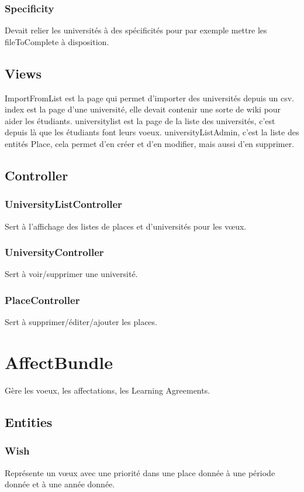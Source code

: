 \subsubsection{Specificity}
Devait relier les universités à des spécificités pour par exemple mettre les fileToComplete à disposition.

\subsection{Views}
ImportFromList est la page qui permet d'importer des universités depuis un csv.
index est la page d'une université, elle devait contenir une sorte de wiki pour aider les étudiants.
universitylist est la page de la liste des universités, c'est depuis là que les étudiants font leurs voeux.
universityListAdmin, c'est la liste des entités Place, cela permet d'en créer et d'en modifier, mais aussi d'en supprimer.

\subsection{Controller}
\subsubsection{UniversityListController}
Sert à l'affichage des listes de places et d'universités pour les vœux.

\subsubsection{UniversityController}
Sert à voir/supprimer une université. 

\subsubsection{PlaceController}
Sert à supprimer/éditer/ajouter les places.


\section{AffectBundle}
Gère les voeux, les affectations, les Learning Agreements.
\subsection{Entities}
\subsubsection{Wish}
Représente un vœux avec une priorité dans une place donnée à une période donnée et à une année donnée.

